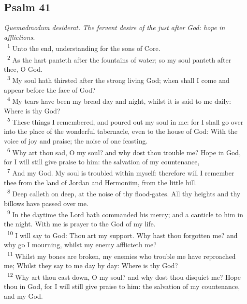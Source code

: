 \documentclass[a5paper,12pt]{article}
\begin{document}
\begin{multicols*}{2}
\section{Psalm 41}
\label{sec:org89884ce}
\emph{Quemadmodum desiderat. The fervent desire of the just after God: hope in afflictions.}\\

~\textsuperscript{1} Unto the end, understanding for the sons of Core.\\
~\textsuperscript{2} As the hart panteth after the fountains of water; so my soul panteth after thee, O God.\\
~\textsuperscript{3} My soul hath thirsted after the strong living God; when shall I come and appear before the face of God?\\
~\textsuperscript{4} My tears have been my bread day and night, whilst it is said to me daily: Where is thy God?\\
~\textsuperscript{5} These things I remembered, and poured out my soul in me: for I shall go over into the place of the wonderful tabernacle, even to the house of God: With the voice of joy and praise; the noise of one feasting.\\
~\textsuperscript{6} Why art thou sad, O my soul? and why dost thou trouble me? Hope in God, for I will still give praise to him: the salvation of my countenance,\\
~\textsuperscript{7} And my God. My soul is troubled within myself: therefore will I remember thee from the land of Jordan and Hermoniim, from the little hill.\\
~\textsuperscript{8} Deep calleth on deep, at the noise of thy flood-gates. All thy heights and thy billows have passed over me.\\
~\textsuperscript{9} In the daytime the Lord hath commanded his mercy; and a canticle to him in the night. With me is prayer to the God of my life.\\
~\textsuperscript{10} I will say to God: Thou art my support. Why hast thou forgotten me? and why go I mourning, whilst my enemy afflicteth me?\\
~\textsuperscript{11} Whilst my bones are broken, my enemies who trouble me have reproached me; Whilst they say to me day by day: Where is thy God?\\
~\textsuperscript{12} Why art thou cast down, O my soul? and why dost thou disquiet me? Hope thou in God, for I will still give praise to him: the salvation of my countenance, and my God.\\


\end{multicols*}
\end{document}
